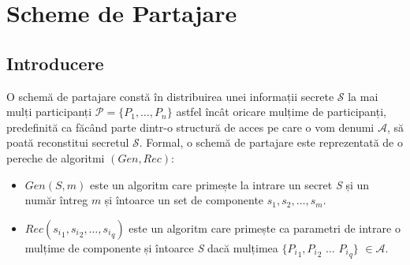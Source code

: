 \documentclass[oneside, 12pt]{book}
\begin{document}

\chapter{Scheme de Partajare}
\label{cha:secret_sharing}


\section{Introducere}
\label{sec:intro_secret_sharing}

O schemă de partajare constă în distribuirea unei informații secrete $\mathcal{S}$ la mai mulți participanți $\mathcal{P} = \{P_1, \dots, P_n\}$ astfel încât oricare mulțime de participanți, predefinită ca făcând parte dintr-o structură de acces pe care o vom denumi $\mathcal{A}$, să poată reconstitui secretul $\mathcal{S}$.
Formal, o schemă de partajare este reprezentată de o pereche de algoritmi \textbf{$(Gen, Rec)$}:
\begin{itemize}
	\item \textit{$Gen(S, m)$} este un algoritm care primește la intrare un secret \textit{S} și un număr întreg $m$ și întoarce un set de componente ${s_1, s_2, \dots, s_m}$.
	\item \textit{$Rec({s_i}_1, {s_i}_2, \dots, {s_i}_q)$} este un algoritm care primește ca parametri de intrare o mulțime de componente și întoarce \textit{S} dacă mulțimea $\{{P_i}_1, {P_i}_2$ $\dots$ ${P_i}_q \}$ $\in \mathcal{A}$.
\end{itemize} 
\end{document}
